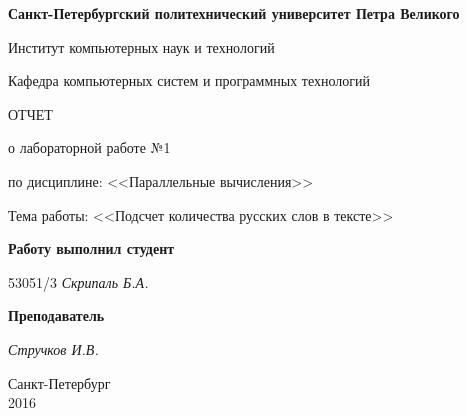 \begin{titlepage}
\begin{center}

\textbf{Санкт-Петербургский политехнический университет Петра Великого}

\vspace{5mm}
Институт компьютерных наук и технологий

\vspace{5mm}
Кафедра компьютерных систем и программных технологий

\vspace*{\fill}

\huge{ОТЧЕТ}

\Large{о лабораторной работе №1}

\large{по дисциплине: <<Параллельные вычисления>>}

\vspace*{2mm}
\large{Тема работы: <<Подсчет количества русских слов в тексте>>}

\vspace*{\fill}
\end{center}

\begin{large}
\hspace{0.4\linewidth} \textbf{Работу выполнил студент}

\vspace{5mm}
\hspace{0.4\linewidth} 53051/3 \hspace{1cm} \textit{Скрипаль Б.А.}

\vspace{3mm}
\hspace{0.4\linewidth} \textbf{Преподаватель}

\vspace{5mm}
\hspace{0.4\linewidth} \underline{\hspace{2cm} } \hspace{3mm} \textit{Стручков И.В.}
\end{large}

\vspace*{3cm}

\begin{center}
\normalsize Санкт-Петербург\\2016
\end{center}
\end{titlepage}